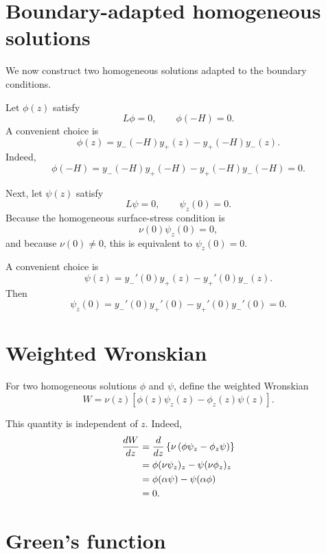 \documentclass[10pt]{amsart}
\begin{document}
\section{Boundary-adapted homogeneous solutions}

We now construct two homogeneous solutions adapted to the boundary conditions.

Let \(\phi(z)\) satisfy
\begin{equation}
L\phi=0,
\qquad
\phi(-H)=0.
\label{eq:phi_def}
\end{equation}
A convenient choice is
\begin{equation}
\phi(z)
=
y_-(-H)y_+(z)-y_+(-H)y_-(z).
\label{eq:phi}
\end{equation}
Indeed,
\[
\phi(-H)
=
y_-(-H)y_+(-H)-y_+(-H)y_-(-H)
=
0.
\]

Next, let \(\psi(z)\) satisfy
\begin{equation}
L\psi=0,
\qquad
\psi_z(0)=0.
\label{eq:psi_def}
\end{equation}
Because the homogeneous surface-stress condition is
\[
\nu(0)\psi_z(0)=0,
\]
and because \(\nu(0)\ne 0\), this is equivalent to \(\psi_z(0)=0\).

A convenient choice is
\begin{equation}
\psi(z)
=
y_-'(0)y_+(z)-y_+'(0)y_-(z).
\label{eq:psi}
\end{equation}
Then
\[
\psi_z(0)
=
y_-'(0)y_+'(0)-y_+'(0)y_-'(0)
=
0.
\]

\section{Weighted Wronskian}

For two homogeneous solutions \(\phi\) and \(\psi\), define the weighted Wronskian
\begin{equation}
W
=
\nu(z)
\left[
\phi(z)\psi_z(z)-\phi_z(z)\psi(z)
\right].
\label{eq:W}
\end{equation}

This quantity is independent of \(z\). Indeed,
\begin{align}
\frac{dW}{dz}
&=
\frac{d}{dz}
\left\{
\nu
\left(
\phi\psi_z-\phi_z\psi
\right)
\right\} \notag\\
&=
\phi(\nu\psi_z)_z-\psi(\nu\phi_z)_z \notag\\
&=
\phi(\alpha\psi)-\psi(\alpha\phi) \notag\\
&=0.
\end{align}

\section{Green's function}
\end{document}
